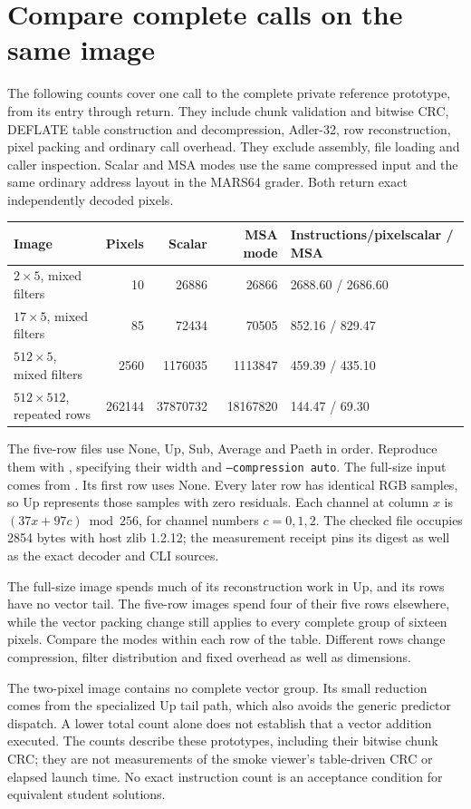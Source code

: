 \section{Compare complete calls on the same image}
The following counts cover one call to the complete private reference prototype,
from its entry through return. They include chunk validation and bitwise CRC,
DEFLATE table construction and decompression, Adler-32, row reconstruction, pixel
packing and ordinary call overhead. They exclude assembly, file loading and caller
inspection. Scalar and MSA modes use the same compressed input and the same ordinary
address layout in the MARS64 grader. Both return exact independently decoded pixels.

\begin{longtable}{p{33mm}r r r p{34mm}}
  \toprule Image                & Pixels & Scalar   & MSA mode & Instructions/pixel\newline scalar / MSA \\\midrule
  $2\times5$, mixed filters     & 10     & 26886    & 26866    & 2688.60 / 2686.60                       \\
  $17\times5$, mixed filters    & 85     & 72434    & 70505    & 852.16 / 829.47                         \\
  $512\times5$, mixed filters   & 2560   & 1176035  & 1113847  & 459.39 / 435.10                         \\
  $512\times512$, repeated rows & 262144 & 37870732 & 18167820 & 144.47 / 69.30                          \\\bottomrule
\end{longtable}
The five-row files use None, Up, Sub, Average and Paeth in order. Reproduce them with
, specifying their width and
\texttt{--compression auto}. The full-size input comes from
. Its first row uses None. Every later row has
identical RGB samples, so Up represents those samples with zero residuals. Each
channel at column $x$ is $(37x+97c)\bmod256$, for channel numbers $c=0,1,2$.
The checked file occupies 2854 bytes with host zlib 1.2.12; the measurement receipt
pins its digest as well as the exact decoder and CLI sources.

The full-size image spends much of its reconstruction work in Up, and its rows have
no vector tail. The five-row images spend four of their five rows elsewhere, while
the vector packing change still applies to every complete group of sixteen pixels.
Compare the modes within each row of the table. Different rows change compression,
filter distribution and fixed overhead as well as dimensions.

The two-pixel image contains no complete vector group. Its small reduction comes from
the specialized Up tail path, which also avoids the generic predictor dispatch.
A lower total count alone does not establish that a vector addition executed.
The counts describe these prototypes, including their bitwise chunk CRC; they are
not measurements of the smoke viewer's table-driven CRC or elapsed launch time.
No exact instruction count is an acceptance condition for equivalent student solutions.
